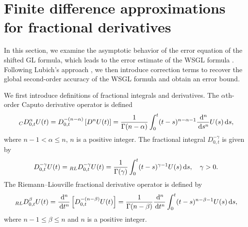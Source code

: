 \documentclass[10pt]{siamltex}
\newcommand{\dx}[1][x]{\,{\rm d}#1}
\newcommand{\cpt}[2][t]{{}_CD^{#2}_{0,#1}}
\begin{document}
\section{Finite difference approximations for fractional derivatives}\label{eq:time-discretization}

In this section, we examine the asymptotic behavior of the error equation of the
shifted  GL formula, which leads to the error estimate of the
WSGL formula \cite{TianZD14}.
Following Lubich's approach \cite{Lub86}, we then introduce correction terms to recover the global second-order
accuracy of the WSGL formula and obtain an error bound.

We first introduce  definitions of fractional integrals and derivatives.
The $\alpha$th-order  Caputo derivative operator is defined \cite{Pod-B99}
\begin{equation}\label{eq:cpt}
\cpt{\alpha}{U(t)}=D^{-(n-\alpha)}_{0,t}\left[D^nU(t)\right]
=\frac{1}{\Gamma(n-\alpha)}\int_{0}^t(t-s)^{n-\alpha-1}\frac{\dx[]^n}{\dx[s]^n}U(s)\dx[s],
\end{equation}
where $n-1<\alpha\leq n$, $n$ is a positive integer.  The fractional integral
  $D^{-\gamma}_{0,t}$ is
given by
\begin{equation}\label{eq:fint}
D^{-\gamma}_{0,t}U(t)={}_{RL}D^{-\gamma}_{0,t}U(t)
=\frac{1}{\Gamma(\gamma)}\int_{0}^t(t-s)^{\gamma-1}{U(s)}\dx[s],{\quad}\gamma>0.
\end{equation}
\iffalse
The Riemann--Liouville fractional derivative operator is  defined by
\begin{equation}\label{eq:rl}
{}_{RL}D_{0,t}^{\beta}{U(t)}=\frac{\dx[]^n}{\dx[t]^n}\left[D^{-(n-\beta)}_{0,t}U(t)\right]
=\frac{1}{\Gamma(n-\beta)}\frac{\dx[]^n}{\dx[t]^n}\int_{0}^t(t-s)^{n-\beta-1}U(s)\dx[s],
\end{equation}
where $n-1\leq\beta\leq n$ and $n$ is a positive integer. \
\end{document}
